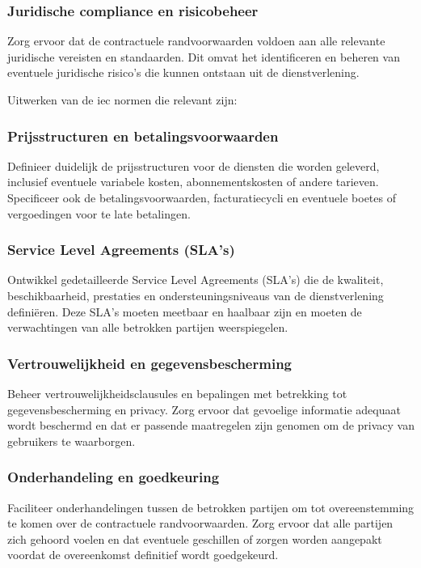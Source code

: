 \subsubsection{Juridische compliance en risicobeheer}
Zorg ervoor dat de contractuele randvoorwaarden voldoen aan alle relevante juridische vereisten en standaarden. Dit omvat het identificeren en beheren van eventuele juridische risico's die kunnen ontstaan uit de dienstverlening. 

Uitwerken van de iec normen die relevant zijn:

\subsubsection{Prijsstructuren en betalingsvoorwaarden}
Definieer duidelijk de prijsstructuren voor de diensten die worden geleverd, inclusief eventuele variabele kosten, abonnementskosten of andere tarieven. Specificeer ook de betalingsvoorwaarden, facturatiecycli en eventuele boetes of vergoedingen voor te late betalingen.

\subsubsection{Service Level Agreements (SLA's)}
Ontwikkel gedetailleerde Service Level Agreements (SLA's) die de kwaliteit, beschikbaarheid, prestaties en ondersteuningsniveaus van de dienstverlening definiëren. Deze SLA's moeten meetbaar en haalbaar zijn en moeten de verwachtingen van alle betrokken partijen weerspiegelen.

\subsubsection{Vertrouwelijkheid en gegevensbescherming}
Beheer vertrouwelijkheidsclausules en bepalingen met betrekking tot gegevensbescherming en privacy. Zorg ervoor dat gevoelige informatie adequaat wordt beschermd en dat er passende maatregelen zijn genomen om de privacy van gebruikers te waarborgen.

\subsubsection{Onderhandeling en goedkeuring}
Faciliteer onderhandelingen tussen de betrokken partijen om tot overeenstemming te komen over de contractuele randvoorwaarden. Zorg ervoor dat alle partijen zich gehoord voelen en dat eventuele geschillen of zorgen worden aangepakt voordat de overeenkomst definitief wordt goedgekeurd.

